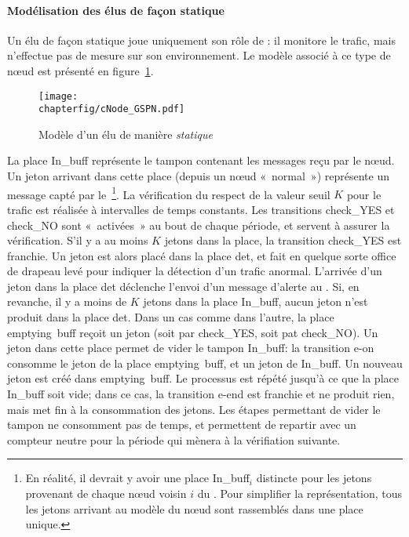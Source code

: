             \paragraph{Modélisation des \cns élus de façon statique}
Un \cn élu de façon statique joue uniquement son rôle de \cn: il monitore le trafic, mais n'effectue pas de mesure sur son environnement.
Le modèle \rpsge associé à ce type de nœud est présenté en figure~\ref{sa:fig:cnodegspn1}.
\begin{figure}[H]
    \centering
    \texttt{[image: \\chapterfig/cNode\_GSPN.pdf]}
    \caption{Modèle \rpsge d'un \cn élu de manière \emph{statique}}\label{sa:fig:cnodegspn1}
\end{figure}
La place \textsf{In\_buff} représente le tampon contenant les messages reçu par le nœud.
Un jeton arrivant dans cette place (depuis un nœud «~normal~») représente un message capté par le \cn\,\footnote{En réalité, il devrait y avoir une place \textsf{In\_buff$_i$} distincte pour les jetons provenant de chaque nœud voisin $i$ du \cn. Pour simplifier la représentation, tous les jetons arrivant au modèle du nœud sont rassemblés dans une place unique.}.
La vérification du respect de la valeur seuil $K$ pour le trafic est réalisée à intervalles de temps constants.
Les transitions \textsf{check\_YES} et \textsf{check\_NO} sont «~activées~» au bout de chaque période, et servent à assurer la vérification.
S'il y a au moins $K$ jetons dans la place, la transition \textsf{check\_YES} est franchie.
Un jeton est alors placé dans la place \textsf{det}, et fait en quelque sorte office de drapeau levé pour indiquer la détection d'un trafic anormal.
L'arrivée d'un jeton dans la place \textsf{det} déclenche l'envoi d'un message d'alerte au \ch.
Si, en revanche, il y a moins de $K$ jetons dans la place \textsf{In\_buff}, aucun jeton n'est produit dans la place \textsf{det}.
Dans un cas comme dans l'autre, la place \textsf{emptying~buff} reçoit un jeton (soit par \textsf{check\_YES}, soit pat \textsf{check\_NO}).
Un jeton dans cette place permet de vider le tampon \textsf{In\_buff}: la transition \textsf{e-on} consomme le jeton de la place \textsf{emptying~buff}, et un jeton de \textsf{In\_buff}.
Un nouveau jeton est créé dans \textsf{emptying~buff}.
Le processus est répété jusqu'à ce que la place \textsf{In\_buff} soit vide; dans ce cas, la transition \textsf{e-end} est franchie et ne produit rien, mais met fin à la consommation des jetons.
Les étapes permettant de vider le tampon ne consomment pas de temps, et permettent de repartir avec un compteur neutre pour la période qui mènera à la vérifiation suivante.

